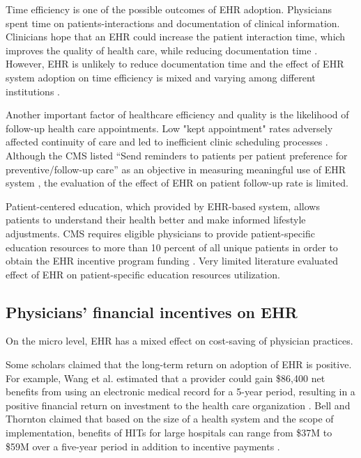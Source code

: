 Time efficiency is one of the possible outcomes of EHR adoption. Physicians spent time on patients-interactions and documentation of clinical information. Clinicians hope that an EHR could increase the patient interaction time, which improves the quality of health care, while reducing documentation time \citep{leung2003incentives}. However, EHR is unlikely to reduce documentation time \citep{poissant2005impact} and the effect of EHR system adoption on time efficiency is mixed and varying among different institutions \citep{Chaudhry2006}.

Another important factor of healthcare efficiency and quality is the likelihood of follow-up health care appointments. Low "kept appointment" rates adversely affected continuity of care and led to inefficient clinic scheduling processes \citep{myers2001strategies}. Although the CMS listed ``Send reminders to patients per patient preference for preventive/follow-up care'' as an objective in measuring meaningful use of EHR system \citep{cmsincentive14}, the evaluation of the effect of EHR on patient follow-up rate is limited.

Patient-centered education, which provided by EHR-based system, allows patients to understand their health better and make informed lifestyle adjustments. CMS requires eligible physicians to provide patient-specific education resources to more than 10 percent of all unique patients in order to obtain the EHR incentive program funding \citep{healthit05}. Very limited literature evaluated effect of EHR on patient-specific education resources utilization. 

\subsection{Physicians' financial incentives on EHR}
On the micro level, EHR has a mixed effect on cost-saving of physician practices.

Some scholars claimed that the long-term return on adoption of EHR is positive. For example, Wang et al. estimated that a provider could gain \$86,400 net benefits from using an electronic medical record for a 5-year period, resulting in a positive financial return on investment to the health care organization \citep{Wang2003}. Bell and Thornton claimed that based on the size of a health system and the scope of implementation, benefits of HITs for large hospitals can range from \$37M to \$59M over a five-year period in addition to incentive payments \citep{Bell2011}.

